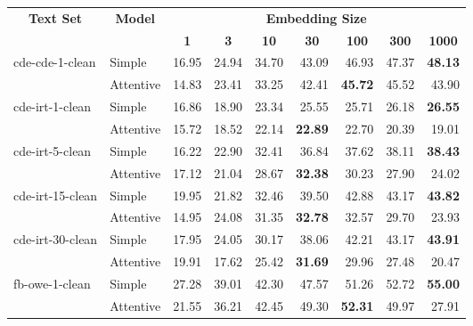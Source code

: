\begin{tabular}{| l | l | r | r | r | r | r | r | r |}
    \hline

    \multicolumn{1}{|c|}{\multirow{2}{*}{\textbf{Text Set}}} &
    \multicolumn{1}{|c|}{\multirow{2}{*}{\textbf{Model}}} &
    \multicolumn{7}{|c|}{\textbf{Embedding Size}} \\

    &
    &
    \multicolumn{1}{|c|}{\textbf{1}} &
    \multicolumn{1}{|c|}{\textbf{3}} &
    \multicolumn{1}{|c|}{\textbf{10}} &
    \multicolumn{1}{|c|}{\textbf{30}} &
    \multicolumn{1}{|c|}{\textbf{100}} &
    \multicolumn{1}{|c|}{\textbf{300}} &
    \multicolumn{1}{|c|}{\textbf{1000}} \\

    \hline \hline

    \multirow{2}{*}{cde-cde-1-clean}
    & Simple    & 16.95 & 24.94 & 34.70 & 43.09 & 46.93 & 47.37 & \textbf{48.13} \\
    & Attentive & 14.83 & 23.41 & 33.25 & 42.41 & \textbf{45.72} & 45.52 & 43.90 \\ \hline

    \multirow{2}{*}{cde-irt-1-clean}
    & Simple    & 16.86 & 18.90 & 23.34 & 25.55 & 25.71 & 26.18 & \textbf{26.55} \\
    & Attentive & 15.72 & 18.52 & 22.14 & \textbf{22.89} & 22.70 & 20.39 & 19.01 \\ \hline

    \multirow{2}{*}{cde-irt-5-clean}
    & Simple    & 16.22 & 22.90 & 32.41 & 36.84 & 37.62 & 38.11 & \textbf{38.43} \\
    & Attentive & 17.12 & 21.04 & 28.67 & \textbf{32.38} & 30.23 & 27.90 & 24.02 \\ \hline

    \multirow{2}{*}{cde-irt-15-clean}
    & Simple    & 19.95 & 21.82 & 32.46 & 39.50 & 42.88 & 43.17 & \textbf{43.82} \\
    & Attentive & 14.95 & 24.08 & 31.35 & \textbf{32.78} & 32.57 & 29.70 & 23.93 \\ \hline

    \multirow{2}{*}{cde-irt-30-clean}
    & Simple    & 17.95 & 24.05 & 30.17 & 38.06 & 42.21 & 43.17 & \textbf{43.91} \\
    & Attentive & 19.91 & 17.62 & 25.42 & \textbf{31.69} & 29.96 & 27.48 & 20.47 \\ \hline \hline

    \multirow{2}{*}{fb-owe-1-clean}
    & Simple    & 27.28 & 39.01 & 42.30 & 47.57 & 51.26 & 52.72 & \textbf{55.00} \\
    & Attentive & 21.55 & 36.21 & 42.45 & 49.30 & \textbf{52.31} & 49.97 & 27.91 \\ \hline


\end{tabular}
